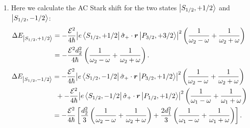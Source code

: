 \documentclass{article}
\theoremstyle{definition}
\newcommand{\f}[2]{\frac{#1}{#2}}
\newcommand{\lp}{\left(}
\newcommand{\rp}{\right)}
\newcommand{\lb}{\left[}
\newcommand{\rb}{\right]}
\begin{document}
\begin{enumerate}[label=(\alph*)]
	\begin{enumerate}[label=(\roman*)]
		\item Here we calculate the AC Stark shift for the two states $\ket{S_{1/2},+1/2}$ and $\ket{S_{1/2}, -1/2}$:
		\begin{align*}
		\Delta E_{\ket{S_{1/2},+1/2}} 
		&= -\f{\mathcal{E}^2}{4\hbar} \abs{ e\bra{S_{1/2},+1/2} \hat{\sigma}_+ \cdot \bm{r} \ket{P_{3/2},+3/2}}^2  \lp\f{1}{\omega_2 - \omega} + \f{1}{\omega_2 + \omega} \rp\\
		&= -\f{\mathcal{E}^2d_2^2}{4\hbar} \lp\f{1}{\omega_2 - \omega} + \f{1}{\omega_2 + \omega} \rp.
		\end{align*}
		\begin{align*}
		\Delta E_{\ket{S_{1/2},-1/2}} &= -\f{\mathcal{E}^2}{4\hbar}  \abs{ e\bra{S_{1/2},-1/2} \hat{\sigma}_+ \cdot \bm{r} \ket{P_{3/2},+1/2}}^2  \lp\f{1}{\omega_2 - \omega} + \f{1}{\omega_2 + \omega} \rp\\
		&\,\,\,+
		-\f{\mathcal{E}^2}{4\hbar}\abs{ e\bra{S_{1/2},-1/2} \hat{\sigma}_+ \cdot \bm{r} \ket{P_{1/2},+1/2}}^2  \lp\f{1}{\omega_1 - \omega} + \f{1}{\omega_1 + \omega} \rp\\
		&=  -\f{\mathcal{E}^2}{4\hbar} \lb \f{d_2^2}{3}  \lp\f{1}{\omega_2 - \omega} + \f{1}{\omega_2 + \omega} \rp  + \f{2d_1^2}{3} \lp\f{1}{\omega_1 - \omega} + \f{1}{\omega_1 + \omega} \rp \rb.
		\end{align*}
		
		
		

\end{enumerate}
\end{enumerate}
\end{document}
